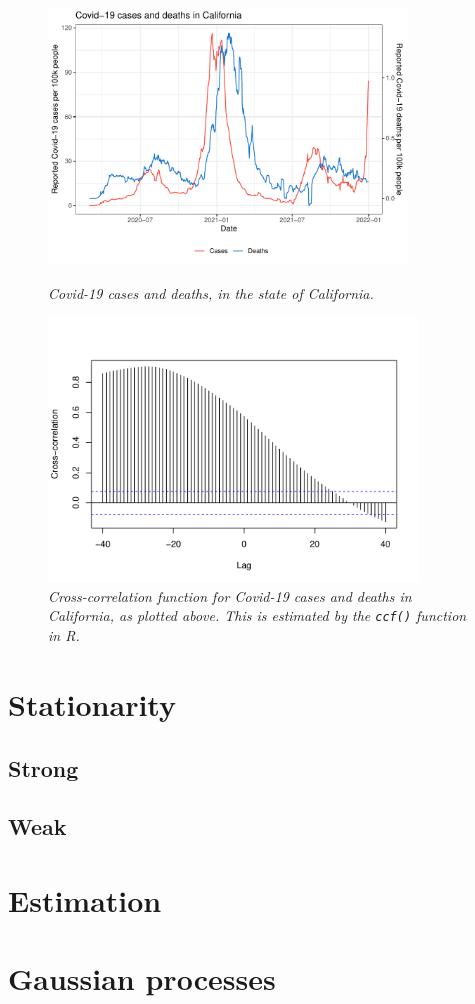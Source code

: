 \documentclass{article}
\begin{document}
\begin{figure}[p]
\centering
\includegraphics[width=0.85\textwidth]{fig/covid-1.pdf}
\caption{\it  Covid-19 cases and deaths, in the state of California.}
\label{fig:covid}

\medskip
\includegraphics[width=0.875\textwidth]{fig/covid-2.pdf}
\caption{\it Cross-correlation function for Covid-19 cases and deaths in
  California, as plotted above. This is estimated by the \texttt{ccf()} function
  in R.}   
\label{fig:crosscor}
\end{figure}

\section{Stationarity}

\subsection{Strong}

\subsection{Weak}

\section{Estimation}

\section{Gaussian processes}
\end{document}
